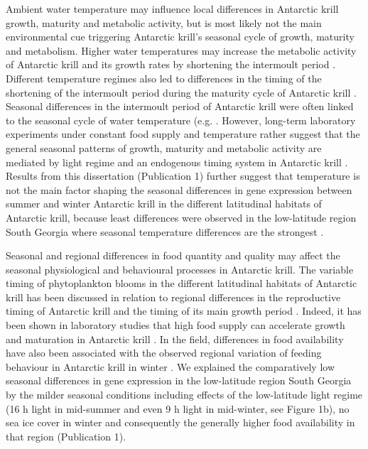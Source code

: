 Ambient water temperature may influence local differences in Antarctic krill
growth, maturity and metabolic activity, but is most likely not the main
environmental cue triggering Antarctic krill's seasonal cycle of growth,
maturity and metabolism. Higher water temperatures may increase the metabolic
activity of Antarctic krill \citep{segawa_oxygen_1979} and its growth rates by
shortening the intermoult period \citep{brown_temperature_2010,
bucht_isolation_1991}.  Different temperature regimes also led to differences
in the timing of the shortening of the intermoult period during the maturity
cycle of Antarctic krill \citep{kawaguchi_male_2007}. Seasonal differences in
the intermoult period of Antarctic krill were often linked to the seasonal
cycle of water temperature (e.g. \citet{kawaguchi_modelling_2006,
tarling_satiation_2006}. However, long-term laboratory experiments under
constant food supply and temperature rather suggest that the general seasonal
patterns of growth, maturity and metabolic activity are mediated by light
regime and an endogenous timing system in Antarctic krill
\citep{brown_temperature_2010, brown_flexible_2011, brown_long-term_2013}.
Results from this dissertation (Publication 1) further suggest that temperature
is not the main factor shaping the seasonal differences in gene expression
between summer and winter Antarctic krill in the different latitudinal habitats
of Antarctic krill, because least differences were observed in the low-latitude
region South Georgia where seasonal temperature differences are the strongest
\citep{whitehouse_seasonal_1996}.

Seasonal and regional differences in food quantity and quality may affect the
seasonal physiological and behavioural processes in Antarctic krill. The
variable timing of phytoplankton blooms in the different latitudinal habitats
of Antarctic krill has been discussed in relation to regional differences in
the reproductive timing of Antarctic krill \citep{spiridonov_spatial_1995} and
the timing of its main growth period \citep{kawaguchi_modelling_2006}. Indeed,
it has been shown in laboratory studies that high food supply
\citep{buchholz_moult_1991} can accelerate growth and maturation in Antarctic
krill \citep{kawaguchi_male_2007}. In the field, differences in food
availability have also been associated with the observed regional variation of
feeding behaviour in Antarctic krill in winter \citep{schmidt_feeding_2014}. We
explained the comparatively low  seasonal differences in gene expression in the
low-latitude region South Georgia by the milder seasonal conditions including
effects of the low-latitude light regime (16 h light in mid-summer and even 9 h
light in mid-winter, see Figure 1b), no sea ice cover in winter and
consequently the generally higher food availability in that region (Publication
1).

